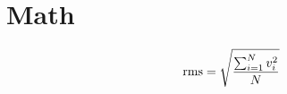 \chapter{Math}

\begin{equation}
  \operatorname{rms} = \sqrt{\frac{\sum_{i = 1}^{N} v_{i}^{2}}{N}}
\end{equation}
